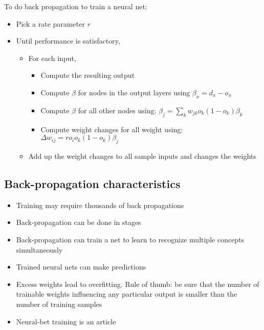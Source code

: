 \documentclass{article}
\begin{document}
To do back propagation to train a neural net:
\begin{itemize}
  \item Pick a rate parameter $r$
  \item Until performance is satisfactory,
    \begin{itemize}
      \item For each input,
        \begin{itemize}
          \item Compute the resulting output
          \item Compute $\beta$ for nodes in the output layers
            using $\beta_{x} = d_x - o_x$
          \item Compute $\beta$ for all other nodes using:
            \begin{math}
              \beta_j = \sum_{k}{w_{jk}o_k(1-o_k)\beta_k}
            \end{math}
          \item Compute weight changes for all weight using:
            \begin{math}
              \Delta{w_{ij}} = ro_io_k(1-o_k)\beta_j
            \end{math}
        \end{itemize}
      \item Add up the weight changes to all sample inputs and
        changes the weights
    \end{itemize}
\end{itemize}

\subsection{Back-propagation characteristics}

\begin{itemize}
  \item Training may require thousands of back propagations
  \item Back-propagation can be done in stages
  \item Back-propagation can train a net to learn to recognize
    multiple concepts simultaneously
  \item Trained neural nets can make predictions
  \item Excess weights lead to overfitting. Rule of thumb: be sure
    that the number of trainable weights influencing any
    particular output is smaller than the number of training
    samples
  \item Neural-bet training is an article
\end{itemize}
\end{document}
